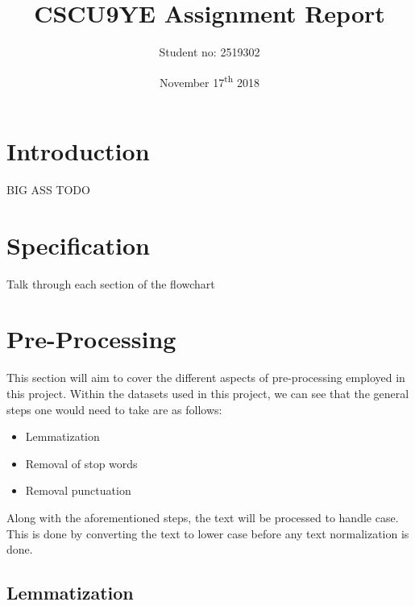 \documentclass[11pt, a4paper]{article}
\title{CSCU9YE Assignment Report}
\author{Student no: 2519302}
\date{November 17\textsuperscript{th} 2018}
\begin{document}
\begin{titlepage}
\maketitle
\thispagestyle{empty}
\end{titlepage}
\doublespacing
{}
\tableofcontents
\newpage
\singlespacing

\section{Introduction}

BIG ASS TODO\cite{DUMMY:1}

\section{Specification}

Talk through each section of the flowchart

\section{Pre-Processing}

This section will aim to cover the different aspects of pre-processing employed in this project. Within the datasets used in this project, we can see that the general steps one would need to take are as follows:
\begin{itemize}
\item Lemmatization
\item Removal of stop words
\item Removal punctuation
\end{itemize} 
Along with the aforementioned steps, the text will be processed to handle case. This is done by converting the text to lower case before any text normalization is done. 

\subsection{Lemmatization}
\end{document}
